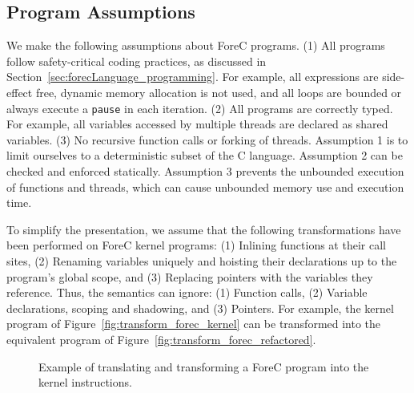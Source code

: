 \subsection{Program Assumptions}
\label{sec:formalSemantics_assumptions}
We make the following assumptions about ForeC programs. 
(1) All programs follow safety-critical coding practices,
as discussed in Section~\ref{sec:forecLanguage_programming}.
For example, all expressions are side-effect free, 
dynamic memory allocation is not used, and all loops are 
bounded or always execute a \verb$pause$ in each iteration.
(2) All programs are correctly typed. For example, all 
variables accessed by multiple threads are declared 
as shared variables. 
(3) No recursive function calls or forking of threads.
Assumption 1 is to limit ourselves to a deterministic 
subset of the C language. Assumption 2 can be checked
and enforced statically. Assumption 3 prevents the unbounded 
execution of functions and threads, which can cause unbounded
memory use and execution time.

To simplify the presentation, we 
assume that the following transformations have been performed on 
ForeC kernel programs: (1) Inlining functions at their call sites, 
(2) Renaming variables uniquely and hoisting their declarations 
up to the program's global scope, and (3) Replacing pointers 
with the variables they reference. 
Thus, the semantics can ignore: (1) Function calls, (2) Variable 
declarations, scoping and shadowing, and (3) Pointers.
For example, the kernel program of 
Figure~\ref{fig:transform_forec_kernel} can be
transformed into the equivalent program of 
Figure~\ref{fig:transform_forec_refactored}.

\begin{figure}
	\centering 
	\hfill
	
	
	\caption{Example of translating and transforming a ForeC program into the kernel instructions.}
	\label{fig:transform_forec}
\end{figure}


